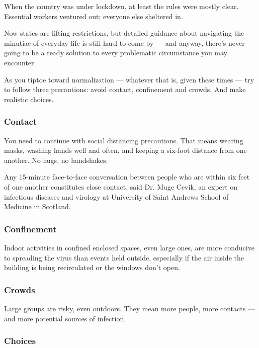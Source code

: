 When the country was under lockdown, at least the rules were mostly
clear. Essential workers ventured out; everyone else sheltered in.

Now states are lifting restrictions, but detailed guidance about
navigating the minutiae of everyday life is still hard to come by ---
and anyway, there's never going to be a ready solution to every
problematic circumstance you may encounter.

As you tiptoe toward normalization --- whatever that is, given these
times --- try to follow three precautions: avoid contact, confinement
and crowds. And make realistic choices.

\hypertarget{contact}{%
\subsubsection{Contact}\label{contact}}

You need to continue with social distancing precautions. That means
wearing masks, washing hands well and often, and keeping a six-foot
distance from one another. No hugs, no handshakes.

Any 15-minute face-to-face conversation between people who are within
six feet of one another constitutes close contact, said Dr. Muge Cevik,
an expert on infectious diseases and virology at University of Saint
Andrews School of Medicine in Scotland.

\hypertarget{confinement}{%
\subsubsection{Confinement}\label{confinement}}

Indoor activities in confined enclosed spaces, even large ones, are more
conducive to spreading the virus than events held outside, especially if
the air inside the building is being recirculated or the windows don't
open.

\hypertarget{crowds}{%
\subsubsection{Crowds}\label{crowds}}

Large groups are risky, even outdoors. They mean more people, more
contacts --- and more potential sources of infection.

\hypertarget{choices}{%
\subsubsection{Choices}\label{choices}}


